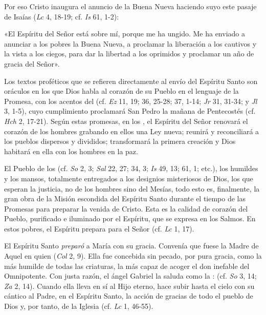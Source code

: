 \begin{ccebody}
	 Por eso Cristo inaugura el anuncio de la Buena Nueva haciendo suyo este pasaje de Isaías (\emph{Lc} 4, 18-19; cf. \emph{Is} 61, 1-2):
	
	«El Espíritu del Señor está sobre mí, porque me ha ungido. Me ha enviado a anunciar a los pobres la Buena Nueva, a proclamar la liberación a los cautivos y la vista a los ciegos, para dar la libertad a los oprimidos y proclamar un año de gracia del Señor».
	
	 Los textos proféticos que se refieren directamente al envío del Espíritu Santo son oráculos en los que Dios habla al corazón de su Pueblo en el lenguaje de la Promesa, con los acentos del  (cf. \emph{Ez} 11, 19; 36, 25-28; 37, 1-14; \emph{Jr} 31, 31-34; y \emph{Jl} 3, 1-5), cuyo cumplimiento proclamará San Pedro la mañana de Pentecostés (cf. \emph{Hch} 2, 17-21). Según estas promesas, en los , el Espíritu del Señor renovará el corazón de los hombres grabando en ellos una Ley nueva; reunirá y reconciliará a los pueblos dispersos y divididos; transformará la primera creación y Dios habitará en ella con los hombres en la paz.
	
	 El Pueblo de los  (cf. \emph{So} 2, 3; \emph{Sal} 22, 27; 34, 3; \emph{Is} 49, 13; 61, 1; etc.), los humildes y los mansos, totalmente entregados a los designios misteriosos de Dios, los que esperan la justicia, no de los hombres sino del Mesías, todo esto es, finalmente, la gran obra de la Misión escondida del Espíritu Santo durante el tiempo de las Promesas para preparar la venida de Cristo. Esta es la calidad de corazón del Pueblo, purificado e iluminado por el Espíritu, que se expresa en los Salmos. En estos pobres, el Espíritu prepara para el Señor  (cf. \emph{Lc} 1, 17).
	
	 El Espíritu Santo \emph{preparó} a María con su gracia. Convenía que fuese  la Madre de Aquel en quien  (\emph{Col} 2, 9). Ella fue concebida sin pecado, por pura gracia, como la más humilde de todas las criaturas, la más capaz de acoger el don inefable del Omnipotente. Con justa razón, el ángel Gabriel la saluda como la :  (cf. \emph{So} 3, 14; \emph{Za} 2, 14). Cuando ella lleva en sí al Hijo eterno, hace subir hasta el cielo con su cántico al Padre, en el Espíritu Santo, la acción de gracias de todo el pueblo de Dios y, por tanto, de la Iglesia (cf. \emph{Lc} 1, 46-55).

\end{ccebody}